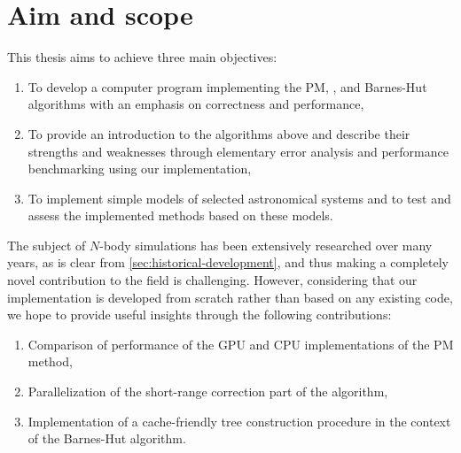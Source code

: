 \section{Aim and scope}
This thesis aims to achieve three main objectives:
\begin{enumerate}
    \item To develop a computer program implementing the PM, \PThreeM{}, and Barnes-Hut algorithms with an emphasis on correctness and performance,
    \item To provide an introduction to the algorithms above and describe their strengths and weaknesses through elementary error analysis and performance benchmarking using our implementation,
    \item To implement simple models of selected astronomical systems and to test and assess the implemented methods based on these models.
\end{enumerate}
The subject of $N$-body simulations has been extensively researched over many years, as is clear from \autoref{sec:historical-development}, and thus making a completely novel contribution to the field is challenging.
However, considering that our implementation is developed from scratch rather than based on any existing code, we hope to provide useful insights through the following contributions:
\begin{enumerate}
    \item Comparison of performance of the GPU and CPU implementations of the PM method,
    \item Parallelization of the short-range correction part of the \PThreeM{} algorithm,
    \item Implementation of a cache-friendly tree construction procedure in the context of the Barnes-Hut algorithm.
\end{enumerate}